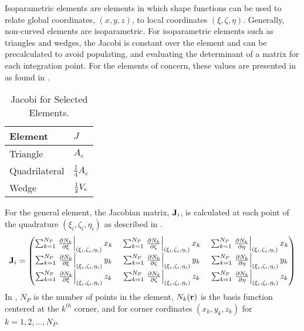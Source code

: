     Isoparametric elements are elements in which shape functions can be used to
    relate global coordinates, $(x,y,z)$, to local coordinates
    $(\xi,\zeta,\eta)$. Generally, non-curved elements are isoparametric. For 
    isoparametric elements such as triangles and wedges, the Jacobi is constant 
    over the element and can be precalculated to avoid populating, and 
    evaluating the determinant of a matrix for each integration point. For the 
    elements of concern, these values are presented in  as 
    found in \cite{textbookcolorado}.
    \begin{table}
      \caption{Jacobi for Selected Elements.}
      \label{tab:jacobi}
      \begin{center}
        \begin{tabular}{ll}
          \toprule
          Element & $J$ \\
          \midrule
          Triangle      & $A_e$ \\
          Quadrilateral & $\frac{1}{4} A_e$ \\
          Wedge         & $\frac{1}{2} V_e$ \\
          \bottomrule
        \end{tabular}
      \end{center}
    \end{table}

    For the general element, the Jacobian matrix, $\mathbf{J}_i$, is calculated at each
    point of the quadrature $(\xi_i,\zeta_i,\eta_i)$ as described in
    .
    \begin{equation}
      \label{eq:calcJacobian}
      \mathbf{J}_i = 
      \begin{pmatrix}
        \sum_{k=1}^{N_P} \left. \frac{\partial N_k}{\partial \xi}
          \right|_{(\xi_i,\zeta_i,\eta_i)} x_k   \; &
        \sum_{k=1}^{N_P} \left. \frac{\partial N_k}{\partial \zeta}
          \right|_{(\xi_i,\zeta_i,\eta_i)} x_k   \; &
        \sum_{k=1}^{N_P} \left. \frac{\partial N_k}{\partial \eta} 
          \right|_{(\xi_i,\zeta_i,\eta_i)} x_k   \\
        \sum_{k=1}^{N_P} \left. \frac{\partial N_k}{\partial \xi}
          \right|_{(\xi_i,\zeta_i,\eta_i)} y_k   \; &
        \sum_{k=1}^{N_P} \left. \frac{\partial N_k}{\partial \zeta} 
          \right|_{(\xi_i,\zeta_i,\eta_i)} y_k   \; &
        \sum_{k=1}^{N_P} \left. \frac{\partial N_k}{\partial \eta} 
          \right|_{(\xi_i,\zeta_i,\eta_i)} y_k   \\
        \sum_{k=1}^{N_P} \left. \frac{\partial N_k}{\partial \xi}
          \right|_{(\xi_i,\zeta_i,\eta_i)} z_k   \; &
        \sum_{k=1}^{N_P} \left. \frac{\partial N_k}{\partial \zeta} 
          \right|_{(\xi_i,\zeta_i,\eta_i)} z_k   \; &
        \sum_{k=1}^{N_P} \left. \frac{\partial N_k}{\partial \eta} 
          \right|_{(\xi_i,\zeta_i,\eta_i)} z_k   
      \end{pmatrix}
    \end{equation}
    In , $N_P$ is the number of points in the element, 
    $N_k(\mathbf{r})$ is the basis function centered at the $k^{th}$ corner, and 
    for corner cordinates $(x_k,y_k,z_k)$ for $k = 1,2,\ldots,N_P$.

